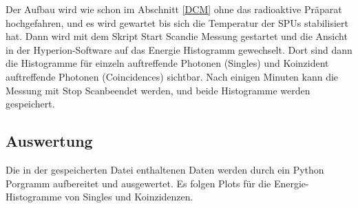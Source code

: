 \documentclass[12pt,twoside,a4paper]{scrartcl}
\begin{document}
		Der Aufbau wird wie schon im Abschnitt \ref{DCM} ohne das radioaktive Präparat hochgefahren, und es wird gewartet bis sich die Temperatur der SPUs stabilisiert hat.
		Dann wird mit dem Skript \glqq Start Scan\grqq die Messung gestartet und die Ansicht in der Hyperion-Software auf das Energie Histogramm gewechselt. Dort sind dann die Histogramme für einzeln auftreffende Photonen (Singles) und Koinzident auftreffende Photonen (Coincidences) sichtbar. Nach einigen Minuten kann die Messung mit \glqq Stop Scan\grqq beendet werden, und beide Histogramme werden gespeichert.

		\subsection{Auswertung}

		Die in der gespeicherten Datei enthaltenen Daten werden durch ein Python Porgramm aufbereitet und ausgewertet.
		Es folgen Plots für die Energie-Histogramme von Singles und Koinzidenzen.
\end{document}
